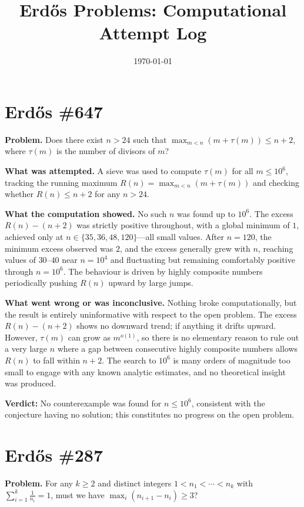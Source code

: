 \documentclass[11pt]{article}
\title{Erdős Problems: Computational Attempt Log}\author{}\date{\today}
\begin{document}
\maketitle

\section{Erdős \#647}

\textbf{Problem.} Does there exist $n > 24$ such that $\max_{m < n}(m + \tau(m)) \leq n + 2$, where $\tau(m)$ is the number of divisors of $m$?

\textbf{What was attempted.} A sieve was used to compute $\tau(m)$ for all $m \leq 10^6$, tracking the running maximum $R(n) = \max_{m < n}(m + \tau(m))$ and checking whether $R(n) \leq n + 2$ for any $n > 24$.

\textbf{What the computation showed.} No such $n$ was found up to $10^6$. The excess $R(n) - (n+2)$ was strictly positive throughout, with a global minimum of $1$, achieved only at $n \in \{35, 36, 48, 120\}$---all small values. After $n = 120$, the minimum excess observed was $2$, and the excess generally grew with $n$, reaching values of $30$--$40$ near $n = 10^4$ and fluctuating but remaining comfortably positive through $n = 10^6$. The behaviour is driven by highly composite numbers periodically pushing $R(n)$ upward by large jumps.

\textbf{What went wrong or was inconclusive.} Nothing broke computationally, but the result is entirely uninformative with respect to the open problem. The excess $R(n) - (n+2)$ shows no downward trend; if anything it drifts upward. However, $\tau(m)$ can grow as $m^{o(1)}$, so there is no elementary reason to rule out a very large $n$ where a gap between consecutive highly composite numbers allows $R(n)$ to fall within $n+2$. The search to $10^6$ is many orders of magnitude too small to engage with any known analytic estimates, and no theoretical insight was produced.

\textbf{Verdict:} No counterexample was found for $n \leq 10^6$, consistent with the conjecture having no solution; this constitutes no progress on the open problem.

\clearpage

\section{Erdős \#287}

\textbf{Problem.} For any $k \geq 2$ and distinct integers $1 < n_1 < \cdots < n_k$ with
$\sum_{i=1}^{k} \frac{1}{n_i} = 1$, must we have $\max_i(n_{i+1} - n_i) \geq 3$?
\end{document}
